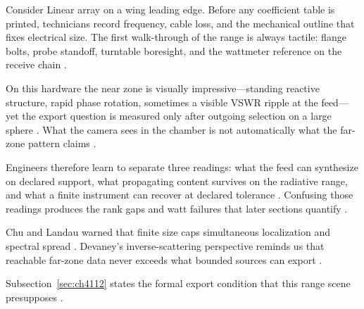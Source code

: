 \begin{physicalvignette}
Consider Linear array on a wing leading edge. Before any coefficient table is printed, technicians record frequency, cable loss, and the mechanical outline that fixes electrical size. The first walk-through of the range is always tactile: flange bolts, probe standoff, turntable boresight, and the wattmeter reference on the receive chain \cite{hansen1988}.

On this hardware the near zone is visually impressive---standing reactive structure, rapid phase rotation, sometimes a visible VSWR ripple at the feed---yet the export question is measured only after outgoing selection on a large sphere \cite{harrington2001}. What the camera sees in the chamber is not automatically what the far-zone pattern claims \cite{stratton1941}.

Engineers therefore learn to separate three readings: what the feed can synthesize on declared support, what propagating content survives on the radiative range, and what a finite instrument can recover at declared tolerance \cite{devaney2004}. Confusing those readings produces the rank gaps and watt failures that later sections quantify \cite{pal2026}.

Chu and Landau warned that finite size caps simultaneous localization and spectral spread \cite{chu1948}. Devaney's inverse-scattering perspective reminds us that reachable far-zone data never exceeds what bounded sources can export \cite{devaney2004}.

Subsection~\ref{sec:ch4112} states the formal export condition that this range scene presupposes \cite{stratton1941}.
\end{physicalvignette}

\label{sec:ch4113}




